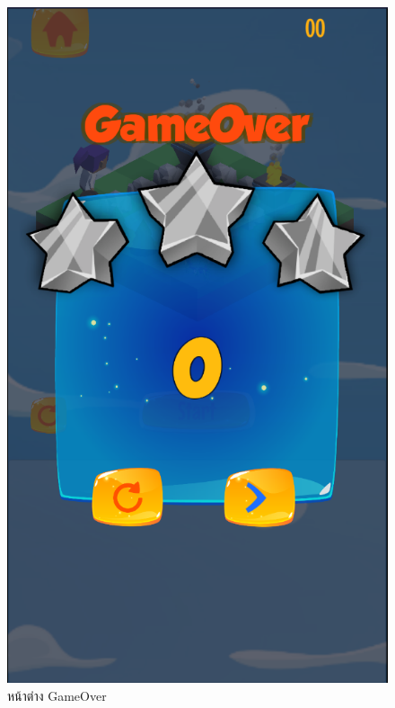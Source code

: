 \begin{figure}[h!]
\begin{center}
\includegraphics[scale = 0.4]{pic/GameOver1.png}
\end{center}
\caption[หน้าต่าง GameOver]{หน้าต่าง GameOver}
\label{lose}
\end{figure}


